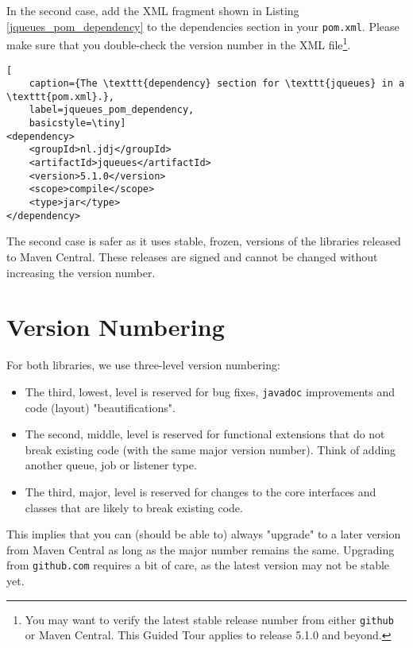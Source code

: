 In the second case,
  add the XML fragment shown in Listing \ref{jqueues_pom_dependency}
  to the dependencies
  section in your \lstinline|pom.xml|.
Please make sure that you double-check the version number in the XML file\footnote{
You may want to verify the latest stable release number
from either \lstinline|github| or Maven Central.
This Guided Tour applies to release 5.1.0 and beyond.}. 
\begin{lstfloat}
\begin{lstlisting}[
	caption={The \texttt{dependency} section for \texttt{jqueues} in a \texttt{pom.xml}.},
	label=jqueues_pom_dependency,
	basicstyle=\tiny]
<dependency>
	<groupId>nl.jdj</groupId>
	<artifactId>jqueues</artifactId>
	<version>5.1.0</version>
	<scope>compile</scope>
	<type>jar</type>
</dependency>	
\end{lstlisting}
\end{lstfloat}
The second case is safer as it uses stable, frozen, versions
  of the libraries released to Maven Central.
These releases are signed and cannot be changed without
  increasing the version number.
  
\section{Version Numbering}

For both libraries, we use three-level version numbering:
\begin{itemize}
	\item The third, lowest, level is reserved for bug fixes,
	        \lstinline|javadoc| improvements
	        and code (layout) "beautifications".
	\item The second, middle, level is reserved for functional extensions
	        that do not break existing code (with the same major version number).
	      Think of adding another queue, job or listener type.
	\item The third, major, level is reserved for changes to the core
	        interfaces and classes that are likely to break existing code.
\end{itemize}
This implies that you can (should be able to) always "upgrade" to a later version
  from Maven Central
  as long as the major number remains the same.
Upgrading from \lstinline|github.com| requires a bit of care,
  as the latest version may not be stable yet.
  
